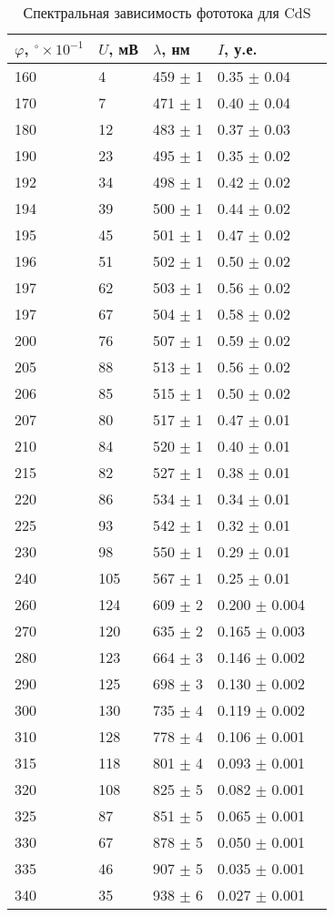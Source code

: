 \begin{table}[ht]
    \centering
    \caption{Спектральная зависимость фототока для CdS}
\begin{tabular}{lllll}
\toprule
$\varphi$, ${}^{\circ} \times 10^{-1} $ &
$U$, мВ &           
$\lambda$, нм &
$I$, у.е.& \\
\midrule
160 &    4 &  459 $\pm$ 1 &    0.35 $\pm$ 0.04 \\
170 &    7 &  471 $\pm$ 1 &    0.40 $\pm$ 0.04 \\
180 &   12 &  483 $\pm$ 1 &    0.37 $\pm$ 0.03 \\
190 &   23 &  495 $\pm$ 1 &    0.35 $\pm$ 0.02 \\
192 &   34 &  498 $\pm$ 1 &    0.42 $\pm$ 0.02 \\
194 &   39 &  500 $\pm$ 1 &    0.44 $\pm$ 0.02 \\
195 &   45 &  501 $\pm$ 1 &    0.47 $\pm$ 0.02 \\
196 &   51 &  502 $\pm$ 1 &    0.50 $\pm$ 0.02 \\
197 &   62 &  503 $\pm$ 1 &    0.56 $\pm$ 0.02 \\
197 &   67 &  504 $\pm$ 1 &    0.58 $\pm$ 0.02 \\
200 &   76 &  507 $\pm$ 1 &    0.59 $\pm$ 0.02 \\
205 &   88 &  513 $\pm$ 1 &    0.56 $\pm$ 0.02 \\
206 &   85 &  515 $\pm$ 1 &    0.50 $\pm$ 0.02 \\
207 &   80 &  517 $\pm$ 1 &    0.47 $\pm$ 0.01 \\
210 &   84 &  520 $\pm$ 1 &    0.40 $\pm$ 0.01 \\
215 &   82 &  527 $\pm$ 1 &    0.38 $\pm$ 0.01 \\
220 &   86 &  534 $\pm$ 1 &    0.34 $\pm$ 0.01 \\
225 &   93 &  542 $\pm$ 1 &    0.32 $\pm$ 0.01 \\
230 &   98 &  550 $\pm$ 1 &    0.29 $\pm$ 0.01 \\
240 &  105 &  567 $\pm$ 1 &    0.25 $\pm$ 0.01 \\
260 &  124 &  609 $\pm$ 2 &    0.200 $\pm$ 0.004 \\
270 &  120 &  635 $\pm$ 2 &    0.165 $\pm$ 0.003 \\
280 &  123 &  664 $\pm$ 3 &    0.146 $\pm$ 0.002 \\
290 &  125 &  698 $\pm$ 3 &    0.130 $\pm$ 0.002 \\
300 &  130 &  735 $\pm$ 4 &    0.119 $\pm$ 0.002 \\
310 &  128 &  778 $\pm$ 4 &    0.106 $\pm$ 0.001 \\
315 &  118 &  801 $\pm$ 4 &    0.093 $\pm$ 0.001 \\
320 &  108 &  825 $\pm$ 5 &    0.082 $\pm$ 0.001 \\
325 &   87 &  851 $\pm$ 5 &    0.065 $\pm$ 0.001 \\
330 &   67 &  878 $\pm$ 5 &    0.050 $\pm$ 0.001 \\
335 &   46 &  907 $\pm$ 5 &    0.035 $\pm$ 0.001 \\
340 &   35 &  938 $\pm$ 6 &    0.027 $\pm$ 0.001 \\
\bottomrule
\end{tabular}
\end{table}
